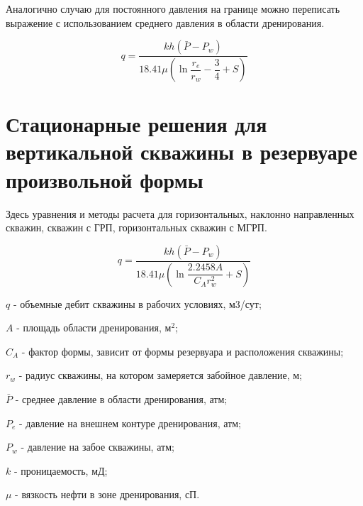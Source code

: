 Аналогично случаю для постоянного давления на границе можно переписать выражение с использованием среднего давления в области дренирования. 

$$q=\frac{kh\left( \bar{P}-P_w\right)}{ 18.41 \mu\left(\ln{\dfrac{r_e}{r_w}} - \dfrac{3}{4}+ S \right)}$$




\section{Стационарные решения для вертикальной скважины в резервуаре произвольной формы}

Здесь уравнения и методы расчета для горизонтальных, наклонно направленных скважин, скважин с ГРП, горизонтальных скважин с МГРП. 

\begin{equation}
	q=\frac{kh\left( \bar{P}-P_w\right)}{ 18.41 \mu\left(\ln{\dfrac{2.2458 A}{C_A r_w^2}} + S \right)}
\end{equation}

$q$ - объемные дебит скважины в рабочих условиях, м3/сут;

$A$ -  площадь области дренирования, м$^2$;

$C_A$ -  фактор формы, зависит от формы резервуара и расположения скважины;

$r_w$ - радиус скважины, на котором замеряется забойное давление, м;

$\bar{P}$ - среднее давление в области дренирования, атм;

$P_e$ - давление на внешнем контуре дренирования, атм;

$P_w$ - давление на забое скважины, атм;

$k$ - проницаемость, мД;

$\mu$ - вязкость нефти в зоне дренирования, сП.

\

